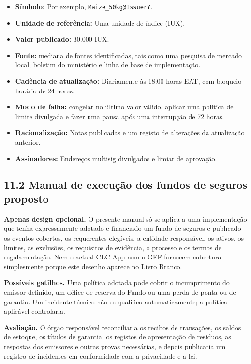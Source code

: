 \documentclass[11pt]{article}
\begin{document}
\begin{itemize}[leftmargin=*]
\item \textbf{Símbolo:} Por exemplo, \texttt{Maize\_50kg@IssuerY}.
\item \textbf{Unidade de referência:} Uma unidade de índice (IUX).
\item \textbf{Valor publicado:} 30.000 IUX.
\item \textbf{Fonte:} mediana de fontes identificadas, tais como uma pesquisa de mercado local, boletim do ministério e linha de base de implementação.
\item \textbf{Cadência de atualização:} Diariamente às 18:00 horas EAT, com bloqueio horário de 24 horas.
\item \textbf{Modo de falha:} congelar no último valor válido, aplicar uma política de limite divulgada e fazer uma pausa após uma interrupção de 72 horas.
\item \textbf{Racionalização:} Notas publicadas e um registo de alterações da atualização anterior.
\item \textbf{Assinadores:} Endereços multisig divulgados e limiar de aprovação.
\end{itemize}
\subsection*{11.2 Manual de execução dos fundos de seguros proposto}

\textbf{Apenas design opcional.} O presente manual só se aplica a uma implementação que tenha expressamente adotado e financiado um fundo de seguros e publicado os eventos cobertos, os requerentes elegíveis, a entidade responsável, os ativos, os limites, as exclusões, os requisitos de evidência, o processo e os termos de regulamentação. Nem o actual CLC App nem o GEF fornecem cobertura simplesmente porque este desenho aparece no Livro Branco.

\textbf{Possíveis gatilhos.} Uma política adotada pode cobrir o incumprimento do emissor definido, um défice de reserva do Fundo ou uma perda de ponta ou de garantia. Um incidente técnico não se qualifica automaticamente; a política aplicável controlaria.

\textbf{Avaliação.} O órgão responsável reconciliaria os recibos de transações, os saldos de estoque, os títulos de garantia, os registos de apresentação de resíduos, as respostas dos emissores e outras provas necessárias, e depois publicaria um registro de incidentes em conformidade com a privacidade e a lei.
\end{document}
